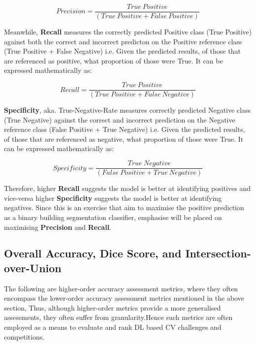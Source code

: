 \documentclass[11pt, a4paper, twoside]{report}
\begin{document}
\begin{equation}
  Precision = \frac{True\ Positive} {(True\ Positive + False\ Positive)}
\end{equation}

Meanwhile, \textbf{Recall} measures the correctly predicted Positive class (True Positive) against both the correct and incorrect predicton on the Positive reference class (True Positive + False Negative) i.e. Given the predicted results, of those that are referenced as positive, what proportion of those were True. It can be expressed mathematically as:

\begin{equation}
  Recall = \frac{True\ Positive} {(True\ Positive + False\ Negative)}
\end{equation}

\textbf{Specificity}, aka. True-Negative-Rate measures correctly predicted Negative class (True Negative) against the correct and incorrect prediction on the Negative reference class (False Positive + True Negative) i.e. Given the predicted results, of those that are referenced as negative, what proportion of those were True. It can be expressed mathematically as:

\begin{equation}
  Specificity = \frac{True\ Negative} {(False\ Positive + True\ Negative)}
\end{equation}

Therefore, higher \textbf{Recall} suggests the model is better at identifying positives and vice-versa higher \textbf{Specificity} suggests the model is better at identifying negatives. Since this is an exercise that aim to maximise the positive prediction as a binary building segmentation classifier, emphasise will be placed on maximising \textbf{Precision} and \textbf{Recall}.\\\par

\subsection{Overall Accuracy, Dice Score, and Intersection-over-Union}\label{2ndorder}

The following are higher-order accuracy assessment metrics, where they often encompass the lower-order accuracy assessment metrics mentioned in the above section, Thus, although higher-order metrics provide a more generalised assessments, they often suffer from granularity.Hence such metrics are often employed as a means to evaluate and rank DL based CV challenges and competitions.
\end{document}
